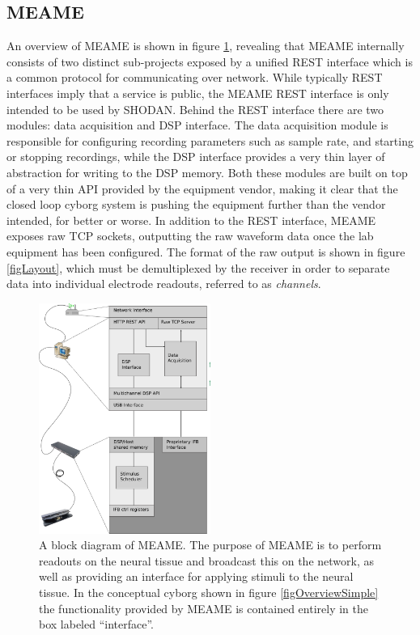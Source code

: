 \subsection{MEAME}
An overview of MEAME is shown in figure \ref{figMEAME}, revealing that MEAME internally
consists of two distinct sub-projects exposed by a unified REST interface which
is a common protocol for communicating over network.
While typically REST interfaces imply that a service is public, the MEAME REST
interface is only intended to be used by SHODAN.
%
Behind the REST interface there are two modules: data acquisition and DSP interface.
%
The data acquisition module is responsible for configuring recording parameters
such as sample rate, and starting or stopping recordings, while the DSP interface
provides a very thin layer of abstraction for writing to the DSP memory.
%
Both these modules are built on top of a very thin API provided by the equipment
vendor, making it clear that the closed loop cyborg system is pushing the
equipment further than the vendor intended, for better or worse.
%
In addition to the REST interface, MEAME exposes raw TCP sockets, outputting the
raw waveform data once the lab equipment has been configured.
%
The format of the raw output is shown in figure \ref{figLayout}, which must be
demultiplexed by the receiver in order to separate data into individual
electrode readouts, referred to as \emph{channels}.
%
\begin{figure}[h!]
  \centering
  \includegraphics[width=0.5\textwidth]{fig/MEAME.png}
  \caption{
    A block diagram of MEAME.
    The purpose of MEAME is to perform readouts on the neural tissue and
    broadcast this on the network, as well as providing an interface for
    applying stimuli to the neural tissue.
    In the conceptual cyborg shown in figure \ref{figOverviewSimple} the
    functionality provided by MEAME is contained entirely in the box labeled
    ``interface''.
  }
  \label{figMEAME}
\end{figure}

